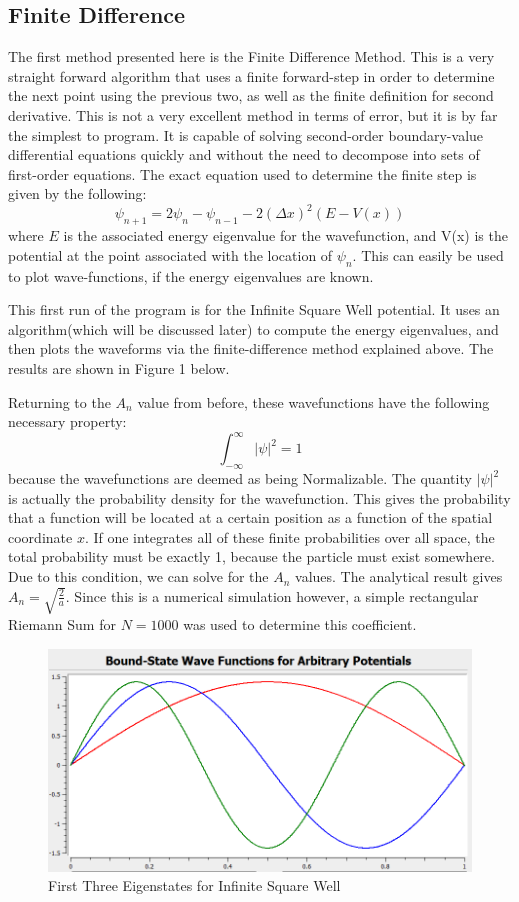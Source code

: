 \documentclass[11pt]{article} %
\begin{document}
\subsection{Finite Difference}
The first method presented here is the Finite Difference Method. This is a very straight forward algorithm that uses a finite forward-step in order to determine the next point using the previous two, as well as the finite definition for second derivative. This is not a very excellent method in terms of error, but it is by far the simplest to program. It is capable of solving second-order boundary-value differential equations quickly and without the need to decompose into sets of first-order equations. The exact equation used to determine the finite step is given by the following:
\begin{equation}
\psi _{n+1} = 2\psi _n - \psi _ {n-1} -2 (\Delta x)^2(E - V(x))
\end{equation}
where $E$ is the associated energy eigenvalue for the wavefunction, and V(x) is the potential at the point associated with the location of $\psi _n$. This can easily be used to plot wave-functions, if the energy eigenvalues are known. 
\par This first run of the program is for the Infinite Square Well potential. It uses an algorithm(which will be discussed later) to compute the energy eigenvalues, and then plots the waveforms via the finite-difference method explained above. The results are shown in Figure 1 below.
\par Returning to the $A_n$ value from before, these wavefunctions have the following necessary property:
\begin{equation}
\int_{-\infty}^\infty|\psi |^2 = 1
\end{equation}
because the wavefunctions are deemed as being Normalizable. The quantity $|\psi |^2$ is actually the probability density for the wavefunction. This gives the probability that a function will be located at a certain position as a function of the spatial coordinate $x$. If one integrates all of these finite probabilities over all space, the total probability must be exactly 1, because the particle must exist somewhere. Due to this condition, we can solve for the $A_n$ values. The analytical result gives $A_n = \sqrt{\frac{2}{a}}$. Since this is a numerical simulation however, a simple rectangular Riemann Sum for $N = 1000$ was used to determine this coefficient. 
\begin{figure}
\centering
\includegraphics[scale = .5]{fp1}
\caption{First Three Eigenstates for Infinite Square Well}
\end{figure}
\end{document}
